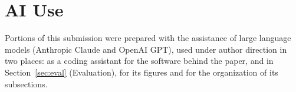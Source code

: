 \section*{AI Use}

Portions of this submission were prepared with the assistance of large language models (Anthropic Claude and OpenAI GPT), used under author direction in two places: as a coding assistant for the software behind the paper, and in Section~\ref{sec:eval} (Evaluation), for its figures and for the organization of its subsections.
